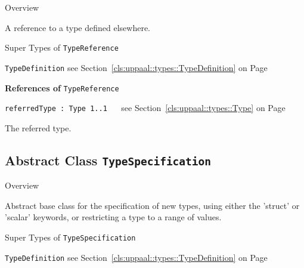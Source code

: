 	\begin{longdescription}
		\item[Overview] 		
				

	

		A reference to a type defined elsewhere.		
		\item[Super Types of \texttt{TypeReference}] ~
			\begin{longdescription}
				\item[\texttt{TypeDefinition}] see Section~\ref{cls:uppaal::types::TypeDefinition} on Page~\pageref{cls:uppaal::types::TypeDefinition}						\end{longdescription}
		
	
			\item[\textbf{References of} \texttt{TypeReference}] ~
			\begin{longdescription}
	\item[\texttt{referredType : Type 	\symbol{"5B}1..1\symbol{"5D}
}] ~
	see Section~\ref{cls:uppaal::types::Type} on Page~\pageref{cls:uppaal::types::Type}
	
	\nopagebreak
		
				

	

		The referred type.		
			\end{longdescription}
	
	\end{longdescription}
	

\subsection{Abstract Class \bfseries \texttt{TypeSpecification}\normalfont}
\label{cls:uppaal::types::TypeSpecification} 
	
	\begin{longdescription}
		\item[Overview] 		
				

	

		Abstract base class for the specification of new types, using either the 'struct' or 'scalar' keywords, or restricting a type to a range of values.		
		\item[Super Types of \texttt{TypeSpecification}] ~
			\begin{longdescription}
				\item[\texttt{TypeDefinition}] see Section~\ref{cls:uppaal::types::TypeDefinition} on Page~\pageref{cls:uppaal::types::TypeDefinition}						\end{longdescription}
		
	
	
	\end{longdescription}
	

